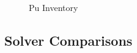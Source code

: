 \begin{figure}
  \centering
  \begin{minipage}{0.5\columnwidth}
    \centering
    \vfill
  \end{minipage}%
  \begin{minipage}{0.5\columnwidth}
    \centering
    \vfill
  \end{minipage}
  \caption{Pu Inventory}\label{foo}
\end{figure}

\subsection{Solver Comparisons}

